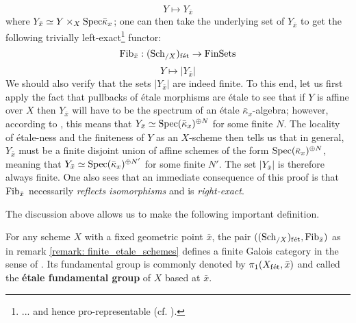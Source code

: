\begin{remark}
                    $$Y \mapsto Y_{\bar{x}}$$
                where $Y_{\bar{x}} \cong Y \x_X \Spec \bar{\kappa}_x$; one can then take the underlying set of $Y_{\bar{x}}$ to get the following trivially left-exact\footnote{... and hence pro-representable (cf. \cite[Proposition 3.1]{grothendieck_fga_2}).} functor:
                    $$\mathrm{Fib}_{\bar{x}}: (\mathrm{Sch}_{/X})_{\mathrm{f\acute{e}t}} \to \mathrm{Fin}\mathrm{Sets}$$
                    $$Y \mapsto |Y_{\bar{x}}|$$
                We should also verify that the sets $|Y_{\bar{x}}|$ are indeed finite. To this end, let us first apply the fact that pullbacks of \'etale morphisms are \'etale to see that if $Y$ is affine over $X$ then $Y_{\bar{x}}$ will have to be the spectrum of an \'etale $\bar{\kappa}_x$-algebra; however, according to \cite[\href{https://stacks.math.columbia.edu/tag/00U3}{Tag 00U3}]{stacks}, this means that $Y_{\bar{x}} \simeq \mathrm{Spec} (\bar{\kappa}_x)^{\oplus N}$ for some finite $N$. The locality of \'etale-ness and the finiteness of $Y$ as an $X$-scheme then tells us that in general, $Y_{\bar{x}}$ must be a finite disjoint union of affine schemes of the form $\mathrm{Spec} (\bar{\kappa}_x)^{\oplus N}$, meaning that $Y_{\bar{x}} \simeq \mathrm{Spec} (\bar{\kappa}_x)^{\oplus N'}$ for some finite $N'$. The set $|Y_{\bar{x}}|$ is therefore always finite. One also sees that an immediate consequence of this proof is that $\mathrm{Fib}_{\bar{x}}$ necessarily \textit{reflects isomorphisms} and is \textit{right-exact}. 
            \end{remark}
            
            The discussion above allows us to make the following important definition.
            \begin{definition} \label{def: etale_fundamental_groups}
                For any scheme $X$ with a fixed geometric point $\bar{x}$, the pair $((\mathrm{Sch}_{/X})_{\mathrm{f\acute{e}t}}, \mathrm{Fib}_{\bar{x}})$ as in remark \ref{remark: finite_etale_schemes} defines a finite Galois category in the sense of \cite[Section 1]{MATH525_covering_spaces_and_fundamental_group_project}. Its fundamental group is commonly denoted by $\pi_1(X_{\mathrm{f\acute{e}t}}, \bar{x})$ and called the \textbf{\'etale fundamental group} of $X$ based at $\bar{x}$.
            \end{definition}
            

